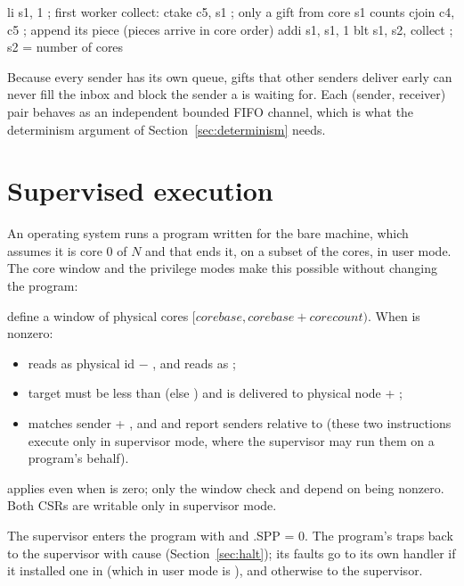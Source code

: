 \begin{asm}
        li    s1, 1                     ; first worker
collect:
        ctake c5, s1                    ; only a gift from core s1 counts
        cjoin c4, c5                    ; append its piece (pieces arrive in core order)
        addi  s1, s1, 1
        blt   s1, s2, collect           ; s2 = number of cores
\end{asm}

Because every sender has its own queue, gifts that other senders deliver early can never fill the
inbox and block the sender a  is waiting for. Each (sender, receiver) pair behaves as
an independent bounded FIFO channel, which is what the determinism argument of
Section~\ref{sec:determinism} needs.

\section{Supervised execution}\label{sec:supervised}

An operating system runs a program written for the bare machine, which assumes it is core 0 of $N$ and
that  ends it, on a subset of the cores, in user mode. The core window and the privilege
modes make this possible without changing the program:

\begin{description}[leftmargin=1em,style=nextline]
\item[\csr{corebase}, \csr{corecount}] define a window of physical cores
  $[\textit{corebase}, \textit{corebase} + \textit{corecount})$. When  is nonzero:
  \begin{itemize}
  \item {} reads as physical id $-$ , and  reads as ;
  \item {} target  must be less than  (else ) and is
        delivered to physical node  + ;
  \item {} matches sender  + , and  and
         report senders relative to  (these two instructions execute only in
        supervisor mode, where the supervisor may run them on a program's behalf).
  \end{itemize}
   applies even when  is zero; only the window check and  depend
  on  being nonzero. Both CSRs are writable only in supervisor mode.
\item[User mode] The supervisor enters the program with  and .SPP = 0. The
  program's  traps back to the supervisor with cause 
  (Section~\ref{sec:halt}); its faults go to its own handler if it installed one in  (which
  in user mode is ), and otherwise to the supervisor.
\end{description}

